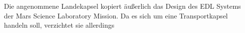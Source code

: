 Die angenommene Landekapsel kopiert äußerlich das Design des EDL Systems der Mars Science Laboratory Mission. Da es sich um eine Transportkapsel handeln soll, verzichtet sie allerdings